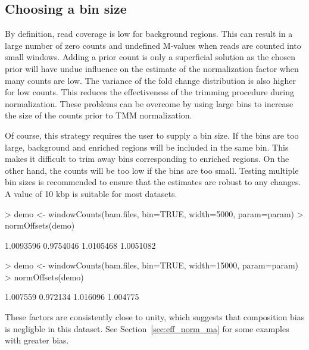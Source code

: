 \documentclass[12pt]{report}
\renewenvironment{Schunk}{\vspace{0pt}}{\vspace{0pt}}
\begin{document}

\subsection{Choosing a bin size}
By definition, read coverage is low for background regions. 
This can result in a large number of zero counts and undefined M-values when reads are counted into small windows. 
Adding a prior count is only a superficial solution as the chosen prior will have undue influence on the estimate of the normalization factor when many counts are low. 
The variance of the fold change distribution is also higher for low counts. 
This reduces the effectiveness of the trimming procedure during normalization. 
These problems can be overcome by using large bins to increase the size of the counts prior to TMM normalization. 

Of course, this strategy requires the user to supply a bin size. 
If the bins are too large, background and enriched regions will be included in the same bin. 
This makes it difficult to trim away bins corresponding to enriched regions.
On the other hand, the counts will be too low if the bins are too small.
Testing multiple bin sizes is recommended to ensure that the estimates are robust to any changes. 
A value of 10 kbp is suitable for most datasets.

\begin{Schunk}
\begin{Sinput}
> demo <- windowCounts(bam.files, bin=TRUE, width=5000, param=param)
> normOffsets(demo)
\end{Sinput}
\begin{Soutput}
[1] 1.0093596 0.9754046 1.0105468 1.0051082
\end{Soutput}
\begin{Sinput}
> demo <- windowCounts(bam.files, bin=TRUE, width=15000, param=param)
> normOffsets(demo)
\end{Sinput}
\begin{Soutput}
[1] 1.007559 0.972134 1.016096 1.004775
\end{Soutput}
\end{Schunk}

These factors are consistently close to unity, which suggests that composition bias is negligble in this dataset.
See Section~\ref{sec:eff_norm_ma} for some examples with greater bias.
\end{document}
